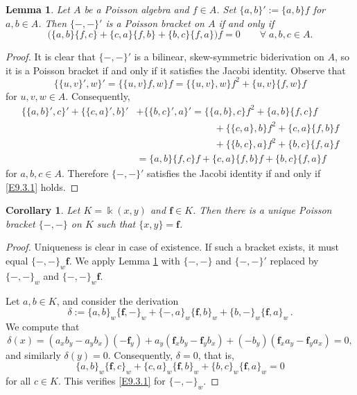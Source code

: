 \documentclass[12pt]{amsart}
\theoremstyle{plain}
\newtheorem{lemma}[theorem]{Lemma}
\newtheorem{corollary}[theorem]{Corollary}
\numberwithin{theorem}{section}
\numberwithin{equation}{theorem}
\theoremstyle{definition}
\newcommand \bff {{\mathbf{f}}}
\begin{document}
\begin{lemma}  \label{zzlem9.3}
Let $A$ be a  Poisson algebra and $f \in A$. Set $\{a,b\}' := \{a,b\} f$ for  $a,b\in A$. Then $\{-,-\}'$ is a Poisson bracket on $A$ if and only if
\begin{equation}  \label{E9.3.1}  \tag{E9.3.1}
\bigl( \{a,b\}\{f,c\} + \{c,a\}\{f,b\} + \{b,c\}\{f,a\} \bigr) f = 0 \qquad \forall\; a,b,c \in A.
\end{equation}
\end{lemma}

\begin{proof}
It is clear that $\{-,-\}'$ is a bilinear, skew-symmetric biderivation on $A$, so it is a Poisson bracket if and only if it satisfies the Jacobi identity. Observe that
$$
\{ \{u,v\}', w\}' = \{ \{u,v\} f, w\} f = \{ \{u,v\},w \} f^2 + \{u,v\} \{f,w\} f
$$
for $u,v,w \in A$. Consequently,
\begin{align*}
\{\{a,b\}',c\}' + \{\{c,a\}',b\}' &+ \{\{b,c\}',a\}' = \{\{a,b\},c\}  f^2 + \{a,b\}\{f,c\} f  \\
&\qquad\qquad\qquad\qquad + \{\{c,a\},b\} f^2 + \{c,a\}\{f,b\} f  \\
&\qquad\qquad\qquad\qquad + \{\{b,c\},a\} f^2 + \{b,c\}\{f,a\} f  \\
&= \{a,b\}\{f,c\} f + \{c,a\}\{f,b\} f + \{b,c\}\{f,a\} f
\end{align*}
for $a,b,c \in A$.
Therefore $\{-,-\}'$ satisfies the Jacobi identity if and only if \eqref{E9.3.1} holds.
\end{proof}


\begin{corollary}  \label{zzcor9.4}
Let $K = \Bbbk(x,y)$ and $\bff \in K$. Then there is a unique Poisson bracket $\{-,-\}$ on $K$ such that $\{x,y\} = \bff$.
\end{corollary}

\begin{proof}
Uniqueness is clear in case of existence. If such a bracket exists, it must equal $\{-,-\}_w \bff$. We apply Lemma \ref{zzlem9.3} with $\{-,-\}$ and $\{-,-\}'$ replaced by $\{-,-\}_w$ and $\{-,-\}_w \bff$.

Let $a,b \in K$, and consider the derivation
$$
\delta := \{a,b\}_w\{\bff,-\}_w + \{-,a\}_w\{\bff,b\}_w + \{b,-\}_w\{\bff,a\}_w \,.
$$
We compute that
$$
\delta(x) = (a_xb_y - a_yb_x) (- \bff_y) + a_y (\bff_xb_y - \bff_yb_x) + (- b_y) (\bff_xa_y - \bff_ya_x) = 0,
$$
and similarly $\delta(y)= 0$. Consequently, $\delta = 0$, that is,
$$
\{a,b\}_w\{\bff,c\}_w + \{c,a\}_w\{\bff,b\}_w + \{b,c\}_w\{\bff,a\}_w = 0
$$
for all $c \in K$. This verifies \eqref{E9.3.1} for $\{-,-\}_w$.
\end{proof}
\end{document}

